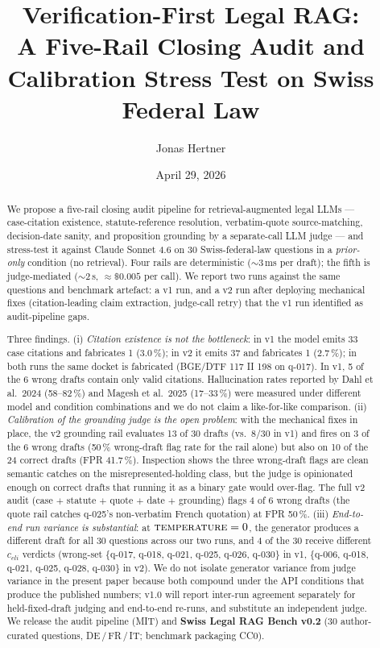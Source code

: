 \documentclass[11pt,a4paper]{article}
\title{Verification-First Legal RAG:\\
A Five-Rail Closing Audit and Calibration Stress Test on
Swiss Federal Law}
\author[1]{Jonas Hertner}
\affil[1]{OpenCaseLaw\,---\,Independent researcher and maintainer\\
          Zurich, Switzerland\\
          \texttt{team@jonashertner.com}\quad\url{https://opencaselaw.ch}}
\date{April 29, 2026}
\begin{document}
\maketitle

\begin{abstract}
We propose a five-rail closing audit pipeline for
retrieval-augmented legal LLMs --- case-citation existence,
statute-reference resolution, verbatim-quote source-matching,
decision-date sanity, and proposition grounding by a
separate-call LLM judge --- and stress-test it against Claude
Sonnet 4.6 on 30 Swiss-federal-law questions in a
\emph{prior-only} condition (no retrieval).  Four rails are
deterministic (${\sim}3$\,ms per draft); the fifth is
judge-mediated (${\sim}2$\,s, ${\approx}\$0.005$ per call).
We report two runs against the same questions and benchmark
artefact: a v1 run, and a v2 run after deploying mechanical
fixes (citation-leading claim extraction, judge-call retry)
that the v1 run identified as audit-pipeline gaps.

Three findings.  (i) \emph{Citation existence is not the
bottleneck}: in v1 the model emits 33 case citations and
fabricates 1 (3.0\,\%); in v2 it emits 37 and fabricates 1
(2.7\,\%); in both runs the same docket is fabricated
(BGE/DTF 117 II 198 on q-017).  In v1, 5 of the 6 wrong
drafts contain only valid citations.  Hallucination rates reported by Dahl et al.\ 2024
(58--82\,\%) and Magesh et al.\ 2025 (17--33\,\%) were measured
under different model and condition combinations and we do not
claim a like-for-like comparison.  (ii) \emph{Calibration of
the grounding judge is the open problem}: with the mechanical
fixes in place, the v2 grounding rail evaluates 13 of 30
drafts (vs.\ 8/30 in v1) and fires on 3 of the 6 wrong
drafts (50\,\% wrong-draft flag rate for the rail alone) but
also on 10 of the 24 correct drafts (FPR 41.7\,\%).
Inspection shows the three wrong-draft flags are clean
semantic catches on the misrepresented-holding class, but
the judge is opinionated enough on correct drafts that
running it as a binary gate would over-flag.  The full v2
audit (case $+$ statute $+$ quote $+$ date $+$ grounding)
flags 4 of 6 wrong drafts (the quote rail catches q-025's
non-verbatim French quotation) at FPR 50\,\%.
(iii) \emph{End-to-end run variance is substantial}: at
$\textsc{temperature}=0$, the generator produces a different
draft for all 30 questions across our two runs, and 4 of the
30 receive different $c_{eli}$ verdicts (wrong-set
$\{$q-017, q-018, q-021, q-025, q-026, q-030$\}$ in v1,
$\{$q-006, q-018, q-021, q-025, q-028, q-030$\}$ in v2).  We
do not isolate generator variance from judge variance in the
present paper because both compound under the API conditions
that produce the published numbers; v1.0 will report
inter-run agreement separately for held-fixed-draft judging
and end-to-end re-runs, and substitute an independent judge.  We release
the audit pipeline (MIT) and \textbf{Swiss Legal RAG Bench
v0.2} (30 author-curated questions, DE\,/\,FR\,/\,IT;
benchmark packaging CC0).
\end{abstract}
\end{document}
